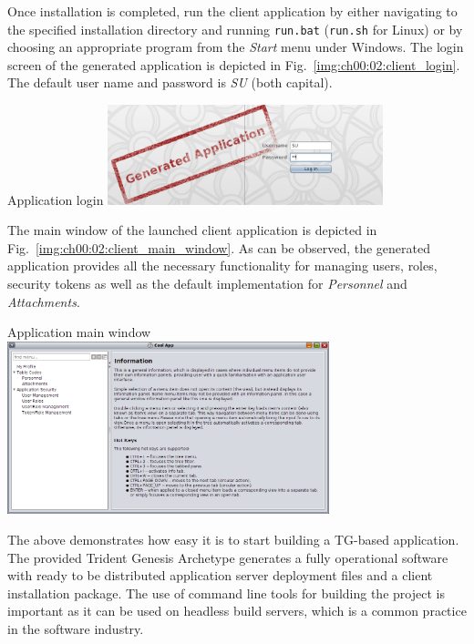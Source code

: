   Once installation is completed, run the client application by either navigating to the specified installation directory and running \texttt{run.bat} (\texttt{run.sh} for Linux) or by choosing an appropriate program from the \emph{Start} menu under Windows.
  The login screen of the generated application is depicted in Fig.~\ref{img:ch00:02:client_login}.
  The default user name and password is \emph{SU} (both capital).

  \begin{image}{Application login}{\label{img:ch00:02:client_login}}    
    \includegraphics[width=0.6\textwidth]{parts/00-part/chapters/01-application-modules/images/04-client-login.png}
  \end{image}

  The main window of the launched client application is depicted in Fig.~\ref{img:ch00:02:client_main_window}.
  As can be observed, the generated application provides all the necessary functionality for managing users, roles, security tokens as well as the default implementation for \emph{Personnel} and \emph{Attachments}.

  \begin{image}{Application main window}{\label{img:ch00:02:client_main_window}}    
    \includegraphics[width=0.7\textwidth]{parts/00-part/chapters/01-application-modules/images/05-client-main-window.png}
  \end{image}

  The above demonstrates how easy it is to start building a TG-based application.
  The provided Trident Genesis Archetype generates a fully operational software with ready to be distributed application server deployment files and a client installation package.
  The use of command line tools for building the project is important as it can be used on headless build servers, which is a common practice in the software industry.

